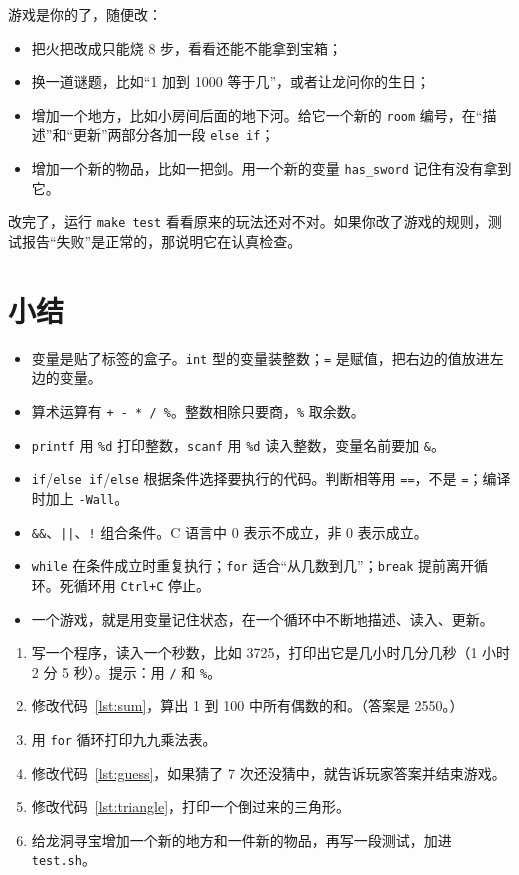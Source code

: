 游戏是你的了，随便改：
\begin{itemize}
  \item 把火把改成只能烧 8 步，看看还能不能拿到宝箱；
  \item 换一道谜题，比如“1 加到 1000 等于几”，或者让龙问你的生日；
  \item 增加一个地方，比如小房间后面的地下河。给它一个新的 \texttt{room} 编号，在“描述”和“更新”两部分各加一段 \texttt{else if}；
  \item 增加一个新的物品，比如一把剑。用一个新的变量 \texttt{has\_sword} 记住有没有拿到它。
\end{itemize}
改完了，运行 \texttt{make test} 看看原来的玩法还对不对。如果你改了游戏的规则，测试报告“失败”是正常的，那说明它在认真检查。

\section{小结}

\begin{itemize}
  \item 变量是贴了标签的盒子。\texttt{int} 型的变量装整数；\texttt{=} 是赋值，把右边的值放进左边的变量。
  \item 算术运算有 \texttt{+ - * / \%}。整数相除只要商，\texttt{\%} 取余数。
  \item \texttt{printf} 用 \texttt{\%d} 打印整数，\texttt{scanf} 用 \texttt{\%d} 读入整数，变量名前要加 \texttt{\&}。
  \item \texttt{if}/\texttt{else if}/\texttt{else} 根据条件选择要执行的代码。判断相等用 \texttt{==}，不是 \texttt{=}；编译时加上 \texttt{-Wall}。
  \item \texttt{\&\&}、\texttt{||}、\texttt{!} 组合条件。C 语言中 0 表示不成立，非 0 表示成立。
  \item \texttt{while} 在条件成立时重复执行；\texttt{for} 适合“从几数到几”；\texttt{break} 提前离开循环。死循环用 \texttt{Ctrl+C} 停止。
  \item 一个游戏，就是用变量记住状态，在一个循环中不断地描述、读入、更新。
\end{itemize}


\begin{enumerate}
  \item 写一个程序，读入一个秒数，比如 3725，打印出它是几小时几分几秒（1 小时 2 分 5 秒）。提示：用 \texttt{/} 和 \texttt{\%}。
  \item 修改代码~\ref{lst:sum}，算出 1 到 100 中所有偶数的和。（答案是 2550。）
  \item 用 \texttt{for} 循环打印九九乘法表。
  \item 修改代码~\ref{lst:guess}，如果猜了 7 次还没猜中，就告诉玩家答案并结束游戏。
  \item 修改代码~\ref{lst:triangle}，打印一个倒过来的三角形。
  \item 给龙洞寻宝增加一个新的地方和一件新的物品，再写一段测试，加进 \texttt{test.sh}。
\end{enumerate}
